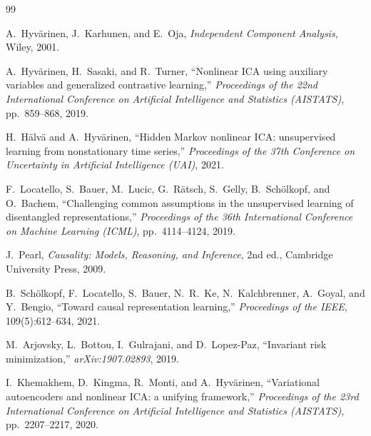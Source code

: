 \documentclass[11pt,a4paper]{article}
\theoremstyle{definition}
\begin{document}
\begin{thebibliography}{99}

  A.\ Hyv\"arinen, J.\ Karhunen, and E.\ Oja,
  \textit{Independent Component Analysis},
  Wiley, 2001.

  A.\ Hyv\"arinen, H.\ Sasaki, and R.\ Turner,
  ``Nonlinear ICA using auxiliary variables and generalized contrastive
  learning,''
  \textit{Proceedings of the 22nd International Conference on Artificial
  Intelligence and Statistics (AISTATS)}, pp.\ 859--868, 2019.

  H.\ H\"alv\"a and A.\ Hyv\"arinen,
  ``Hidden Markov nonlinear ICA: unsupervised learning from nonstationary time
  series,''
  \textit{Proceedings of the 37th Conference on Uncertainty in Artificial
  Intelligence (UAI)}, 2021.

  F.\ Locatello, S.\ Bauer, M.\ Lucic, G.\ R\"atsch, S.\ Gelly,
  B.\ Sch\"olkopf, and O.\ Bachem,
  ``Challenging common assumptions in the unsupervised learning of
  disentangled representations,''
  \textit{Proceedings of the 36th International Conference on Machine
  Learning (ICML)}, pp.\ 4114--4124, 2019.

  J.\ Pearl,
  \textit{Causality: Models, Reasoning, and Inference},
  2nd ed., Cambridge University Press, 2009.

  B.\ Sch\"olkopf, F.\ Locatello, S.\ Bauer, N.\ R.\ Ke, N.\ Kalchbrenner,
  A.\ Goyal, and Y.\ Bengio,
  ``Toward causal representation learning,''
  \textit{Proceedings of the IEEE}, 109(5):612--634, 2021.

  M.\ Arjovsky, L.\ Bottou, I.\ Gulrajani, and D.\ Lopez-Paz,
  ``Invariant risk minimization,''
  \textit{arXiv:1907.02893}, 2019.

  I.\ Khemakhem, D.\ Kingma, R.\ Monti, and A.\ Hyv\"arinen,
  ``Variational autoencoders and nonlinear ICA: a unifying framework,''
  \textit{Proceedings of the 23rd International Conference on Artificial
  Intelligence and Statistics (AISTATS)}, pp.\ 2207--2217, 2020.

\end{thebibliography}
\end{document}
